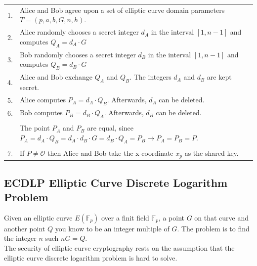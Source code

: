 \begin{tabular}{l p{14cm}}
	1.	&	Alice and Bob agree upon a set of elliptic curve domain parameters $T=(p,a,b,G,n,h)$. \\
	2.	&	Alice randomly chooses a secret integer $d_A$ in the interval $[1,n-1]$ and computes $Q_A=d_A \cdot G$\\
	3.	&	Bob randomly chooses a secret integer $d_B$ in the interval $[1,n-1]$ and computes $Q_B=d_B \cdot G$\\
	4.	&	Alice and Bob exchange $Q_A$ and $Q_B$. The integers $d_A$ and $d_B$ are kept secret.\\
	5.	&	Alice computes $P_A=d_A \cdot Q_B$. Afterwards, $d_A$ can be deleted. \\
	6.	&	Bob computes $P_B=d_B \cdot Q_A$. Afterwards, $d_B$ can be deleted. \\
		&	\\
		&	The point $P_A$ and $P_B$ are equal, since $P_A=d_A \cdot Q_B = d_A \cdot d_B \cdot G = d_B \cdot Q_A = P_B \to P_A = P_B = P$.\\
		&	\\
	7.	&	If $P \neq \mathcal{O}$ then Alice and Bob take the x-coordinate $x_p$ as the shared key.
\end{tabular}

\subsection{ECDLP Elliptic Curve Discrete Logarithm Problem}

Given an elliptic curve $E(\mathbb{F}_p)$ over a finit field $\mathbb{F}_p$, a point $G$ on that curve and another point $Q$ you know to
be an integer multiple of $G$. The problem is to find the integer $n$ such $nG=Q$.\\
The security of elliptic curve cryptography rests on the assumption that the elliptic curve discrete logarithm problem is hard to solve.\\

